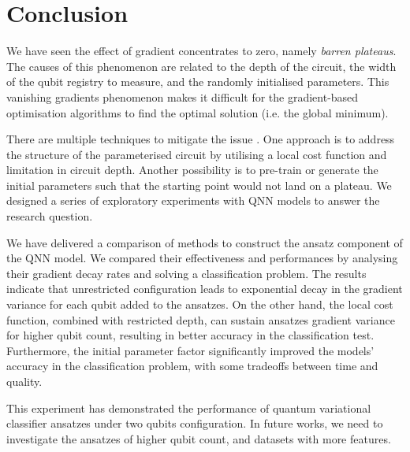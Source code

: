 \section{Conclusion}
We have seen the effect of gradient concentrates to zero, namely \emph{barren plateaus}.
The causes of this phenomenon are related to the depth of the circuit, the width of the qubit registry to measure, and the randomly initialised parameters.
This vanishing gradients phenomenon makes it difficult for the gradient-based optimisation algorithms to find the optimal solution (i.e. the global minimum).

There are multiple techniques to mitigate the issue \cite{cerezoCostFunctionDependent2021, skolikLayerwiseLearningQuantum2021, grantInitializationStrategyAddressing2019}.
One approach is to address the structure of the parameterised circuit by utilising a local cost function and limitation in circuit depth.
Another possibility is to pre-train or generate the initial parameters such that the starting point would not land on a plateau.
We designed a series of exploratory experiments with QNN models to answer the research question.

We have delivered a comparison of methods to construct the ansatz component of the QNN model.
We compared their effectiveness and performances by analysing their gradient decay rates and solving a classification problem.
The results indicate that unrestricted configuration leads to exponential decay in the gradient variance for each qubit added to the ansatzes.
On the other hand, the local cost function, combined with restricted depth, can sustain ansatzes gradient variance for higher qubit count, resulting in better accuracy in the classification test.
Furthermore, the initial parameter factor significantly improved the models' accuracy in the classification problem, with some tradeoffs between time and quality.

This experiment has demonstrated the performance of quantum variational classifier ansatzes under two qubits configuration.
In future works, we need to investigate the ansatzes of higher qubit count, and datasets with more features.

